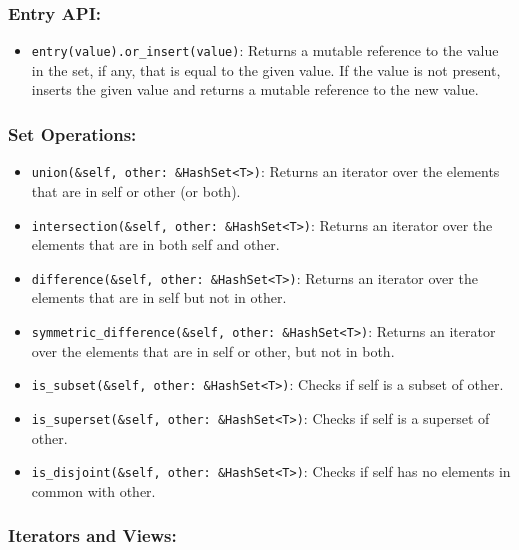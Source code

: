 \documentclass[
  11pt,
]{article}
\providecommand{\tightlist}{%
  \setlength{\itemsep}{0pt}\setlength{\parskip}{0pt}}
\begin{document}
\subsubsection{Entry API:}\label{entry-api-1}

\begin{itemize}
\tightlist
\item
  \texttt{entry(value).or\_insert(value)}: Returns a mutable reference
  to the value in the set, if any, that is equal to the given value. If
  the value is not present, inserts the given value and returns a
  mutable reference to the new value.
\end{itemize}

\subsubsection{Set Operations:}\label{set-operations}

\begin{itemize}
\tightlist
\item
  \texttt{union(\&self,\ other:\ \&HashSet\textless{}T\textgreater{})}:
  Returns an iterator over the elements that are in self or other (or
  both).
\item
  \texttt{intersection(\&self,\ other:\ \&HashSet\textless{}T\textgreater{})}:
  Returns an iterator over the elements that are in both self and other.
\item
  \texttt{difference(\&self,\ other:\ \&HashSet\textless{}T\textgreater{})}:
  Returns an iterator over the elements that are in self but not in
  other.
\item
  \texttt{symmetric\_difference(\&self,\ other:\ \&HashSet\textless{}T\textgreater{})}:
  Returns an iterator over the elements that are in self or other, but
  not in both.
\item
  \texttt{is\_subset(\&self,\ other:\ \&HashSet\textless{}T\textgreater{})}:
  Checks if self is a subset of other.
\item
  \texttt{is\_superset(\&self,\ other:\ \&HashSet\textless{}T\textgreater{})}:
  Checks if self is a superset of other.
\item
  \texttt{is\_disjoint(\&self,\ other:\ \&HashSet\textless{}T\textgreater{})}:
  Checks if self has no elements in common with other.
\end{itemize}

\subsubsection{Iterators and Views:}\label{iterators-and-views-1}
\end{document}
